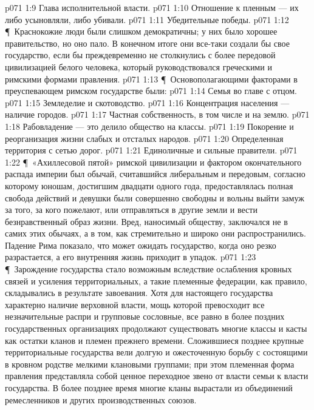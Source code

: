 \vs p071 1:9 \bibnobreakspace Глава исполнительной власти.
\vs p071 1:10 \bibnobreakspace Отношение к пленным --- их либо усыновляли, либо убивали.
\vs p071 1:11 \bibnobreakspace Убедительные победы.
\vs p071 1:12 \P\ Краснокожие люди были слишком демократичны; у них было хорошее правительство, но оно пало. В конечном итоге они все\hyp{}таки создали бы свое государство, если бы преждевременно не столкнулись с более передовой цивилизацией белого человека, который руководствовался греческими и римскими формами правления.
\vs p071 1:13 \P\ Основополагающими факторами в преуспевающем римском государстве были:
\vs p071 1:14 \bibnobreakspace Семья во главе с отцом.
\vs p071 1:15 \bibnobreakspace Земледелие и скотоводство.
\vs p071 1:16 \bibnobreakspace Концентрация населения --- наличие городов.
\vs p071 1:17 \bibnobreakspace Частная собственность, в том числе и на землю.
\vs p071 1:18 \bibnobreakspace Рабовладение --- это делило общество на классы.
\vs p071 1:19 \bibnobreakspace Покорение и реорганизация жизни слабых и отсталых народов.
\vs p071 1:20 \bibnobreakspace Определенная территория с сетью дорог.
\vs p071 1:21 \bibnobreakspace Единоличные и сильные правители.
\vs p071 1:22 \P\ «Ахиллесовой пятой» римской цивилизации и фактором окончательного распада империи был обычай, считавшийся либеральным и передовым, согласно которому юношам, достигшим двадцати одного года, предоставлялась полная свобода действий и девушки были совершенно свободны и вольны выйти замуж за того, за кого пожелают, или отправляться в другие земли и вести безнравственный образ жизни. Вред, наносимый обществу, заключался не в самих этих обычаях, а в том, как стремительно и широко они распространились. Падение Рима показало, что может ожидать государство, когда оно резко разрастается, а его внутренняя жизнь приходит в упадок.
\vs p071 1:23 \P\ Зарождение государства стало возможным вследствие ослабления кровных связей и усиления территориальных, а такие племенные федерации, как правило, складывались в результате завоевания. Хотя для настоящего государства характерно наличие верховной власти, мощь которой превосходит все незначительные распри и групповые сословные, все равно в более поздних государственных организациях продолжают существовать многие классы и касты как остатки кланов и племен прежнего времени. Сложившиеся позднее крупные территориальные государства вели долгую и ожесточенную борьбу с состоящими в кровном родстве мелкими клановыми группами; при этом племенная форма правления представляла собой ценное переходное звено от власти семьи к власти государства. В более позднее время многие кланы вырастали из объединений ремесленников и других производственных союзов.
